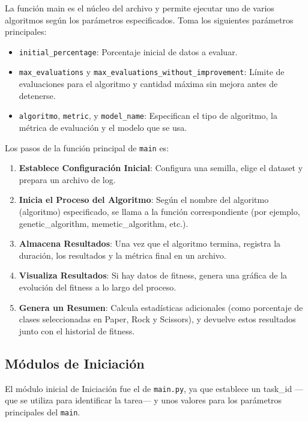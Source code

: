 La función main es el núcleo del archivo y permite ejecutar uno de varios algoritmos según los parámetros
especificados.
Toma los siguientes parámetros principales:
\begin{itemize}
      \item \texttt{initial\_percentage}: Porcentaje inicial de datos a evaluar.
      \item \texttt{max\_evaluations} y \texttt{max\_evaluations\_without\_improvement}: Límite de evaluaciones para el
            algoritmo y cantidad máxima sin mejora antes de detenerse.
      \item \texttt{algoritmo}, \texttt{metric}, y \texttt{model\_name}: Especifican el tipo de algoritmo, la métrica de
            evaluación y el modelo que se usa.
\end{itemize}

Los pasos de la función principal de \texttt{main} es:
\begin{enumerate}
      \item \textbf{Establece Configuración Inicial}: Configura una semilla, elige el dataset y prepara un archivo de log.
      \item \textbf{Inicia el Proceso del Algoritmo}: Según el nombre del algoritmo (algoritmo) especificado, se llama a
            la función correspondiente (por ejemplo, genetic\_algorithm, memetic\_algorithm, etc.).
      \item \textbf{Almacena Resultados}: Una vez que el algoritmo termina, registra la duración, los resultados y la
            métrica final en un archivo.
      \item \textbf{Visualiza Resultados}: Si hay datos de fitness, genera una gráfica de la evolución del fitness a lo
            largo del proceso.
      \item \textbf{Genera un Resumen}: Calcula estadísticas adicionales (como porcentaje de clases seleccionadas en
            Paper, Rock y Scissors), y devuelve estos resultados junto con el historial de fitness.
\end{enumerate}

\subsection{Módulos de Iniciación}\label{subsec:modulos-de-iniciacion}
El módulo inicial de Iniciación fue el de \texttt{main.py}, ya que establece un task\_id —que se utiliza para
identificar la tarea— y unos valores para los parámetros principales del \texttt{main}.


